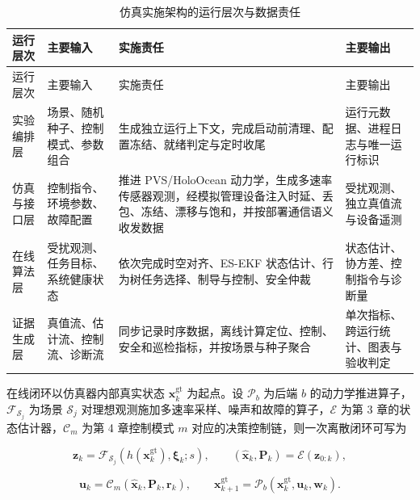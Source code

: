 \begin{longtable}[]{@{}
  >{\raggedright\arraybackslash}p{}
  >{\raggedright\arraybackslash}p{}
  >{\raggedright\arraybackslash}p{}
  >{\raggedright\arraybackslash}p{}@{}}
\caption{仿真实施架构的运行层次与数据责任}\label{tab:ch05-simulation-implementation}\tabularnewline
\toprule\noalign{}
运行层次 & 主要输入 & 实施责任 & 主要输出 \\
\midrule\noalign{}
\endfirsthead
\toprule\noalign{}
运行层次 & 主要输入 & 实施责任 & 主要输出 \\
\midrule\noalign{}
\endhead
\bottomrule\noalign{}
\endlastfoot
实验编排层 & 场景、随机种子、控制模式、参数组合 & 生成独立运行上下文，完成启动前清理、配置冻结、就绪判定与定时收尾 & 运行元数据、进程日志与唯一运行标识 \\
仿真与接口层 & 控制指令、环境参数、故障配置 & 推进 PVS/HoloOcean 动力学，生成多速率传感器观测，经模拟管理设备注入时延、丢包、冻结、漂移与饱和，并按部署通信语义收发数据 & 受扰观测、独立真值流与设备遥测 \\
在线算法层 & 受扰观测、任务目标、系统健康状态 & 依次完成时空对齐、ES-EKF 状态估计、行为树任务选择、制导与控制、安全仲裁 & 状态估计、协方差、控制指令与诊断量 \\
证据生成层 & 真值流、估计流、控制流、诊断流 & 同步记录时序数据，离线计算定位、控制、安全和巡检指标，并按场景与种子聚合 & 单次指标、跨运行统计、图表与验收判定 \\
\end{longtable}

在线闭环以仿真器内部真实状态 \(\boldsymbol{x}^{\mathrm{gt}}_k\) 为起点。设 \(\mathcal{P}_b\) 为后端 \(b\) 的动力学推进算子，\(\mathcal{F}_{\mathcal{S}_j}\) 为场景 \(\mathcal{S}_j\) 对理想观测施加多速率采样、噪声和故障的算子，\(\mathcal{E}\) 为第 3 章的状态估计器，\(\mathcal{C}_m\) 为第 4 章控制模式 \(m\) 对应的决策控制链，则一次离散闭环可写为

\begin{equation}
\boldsymbol{z}_k
=
\mathcal{F}_{\mathcal{S}_j}
\!\left(h(\boldsymbol{x}^{\mathrm{gt}}_k),\boldsymbol{\xi}_k;s\right),
\qquad
(\hat{\boldsymbol{x}}_k,\boldsymbol{P}_k)
=
\mathcal{E}(\boldsymbol{z}_{0:k}),
\label{eq:ch05-closed-loop-obs}
\end{equation}

\begin{equation}
\boldsymbol{u}_k
=
\mathcal{C}_m(\hat{\boldsymbol{x}}_k,\boldsymbol{P}_k,\boldsymbol{r}_k),
\qquad
\boldsymbol{x}^{\mathrm{gt}}_{k+1}
=
\mathcal{P}_b(\boldsymbol{x}^{\mathrm{gt}}_k,\boldsymbol{u}_k,\boldsymbol{w}_k).
\label{eq:ch05-closed-loop-dyn}
\end{equation}

